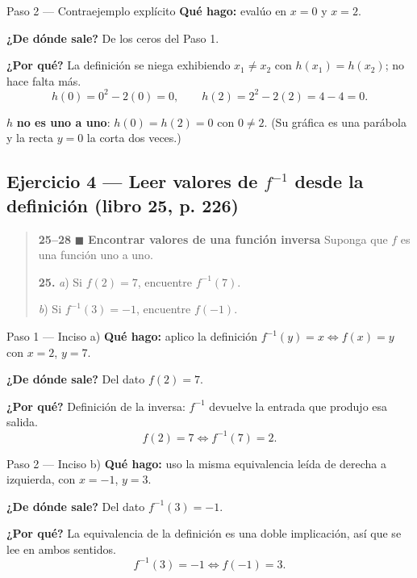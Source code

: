 \documentclass[11pt]{article}
\begin{document}
\begin{paso}{Paso 2 --- Contraejemplo explícito}
\textbf{Qué hago:} evalúo en $x=0$ y $x=2$.

\textbf{¿De dónde sale?} De los ceros del Paso 1.

\textbf{¿Por qué?} La definición se niega exhibiendo $x_1\neq x_2$ con $h(x_1)=h(x_2)$; no hace falta más.
\[
h(0)=0^2-2(0)=0, \qquad h(2)=2^2-2(2)=4-4=0.
\]
\end{paso}

\begin{resp}
$h$ \textbf{no es uno a uno}: $h(0)=h(2)=0$ con $0\neq 2$. (Su gráfica es una parábola y la recta $y=0$ la corta dos veces.)
\end{resp}

\subsection*{Ejercicio 4 --- Leer valores de $f^{-1}$ desde la definición (libro 25, p. 226)}

\begin{quote}
\textbf{25--28} $\blacksquare$ \textbf{Encontrar valores de una función inversa} Suponga que $f$ es una función uno a uno.

\textbf{25.} \textit{a}) Si $f(2)=7$, encuentre $f^{-1}(7)$.

\hspace{1.2em}\textit{b}) Si $f^{-1}(3)=-1$, encuentre $f(-1)$.
\end{quote}

\begin{paso}{Paso 1 --- Inciso a)}
\textbf{Qué hago:} aplico la definición $f^{-1}(y)=x \iff f(x)=y$ con $x=2$, $y=7$.

\textbf{¿De dónde sale?} Del dato $f(2)=7$.

\textbf{¿Por qué?} Definición de la inversa: $f^{-1}$ devuelve la entrada que produjo esa salida.
\[
f(2)=7 \iff f^{-1}(7)=2.
\]
\end{paso}

\begin{paso}{Paso 2 --- Inciso b)}
\textbf{Qué hago:} uso la misma equivalencia leída de derecha a izquierda, con $x=-1$, $y=3$.

\textbf{¿De dónde sale?} Del dato $f^{-1}(3)=-1$.

\textbf{¿Por qué?} La equivalencia de la definición es una doble implicación, así que se lee en ambos sentidos.
\[
f^{-1}(3)=-1 \iff f(-1)=3.
\]
\end{paso}
\end{document}
